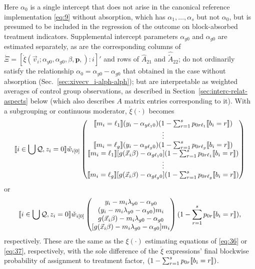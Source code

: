 \documentclass{article}
\DeclarePairedDelimiter{\indicator}{\llbracket}{\rrbracket}
\newcommand{\owt}[1][{[z_{i}]}]{\ensuremath{\check{w}_{i#1}}}
\begin{document}
Here $\alpha_{0}$ is a single intercept
that does not arise
in the canonical reference implementation \eqref{eq:9} without absorption, which has $\alpha_{1},
\ldots, \alpha_{s}$ but not $\alpha_{0}$,
but is presumed to be included in the
regression of the outcome on block-absorbed treatment indicators.
Supplemental intercept parameters $\alpha_{y0}$ and $\alpha_{g0}$ are estimated separately, as are the corresponding
columns of $\acute{\Xi} = [\acute{\xi}(\vec{v}_{i}; {\alpha}_{y0}, {\alpha}_{g0}, \beta, {\mathbf{p}}, ) :i]'$ and rows of $\hat{A}_{21}$ and $\hat{\tilde{A}}_{22}$; do not ordinarily satisfy the relationship $\alpha_{0} = \alpha_{y0} - \alpha_{g0}$ that obtained in the case without absorption (Sec.~\ref{sec:xivecv_i-alph-alph}); but are
interpretable as weighted averages of control group
observations, as described in Section~\ref{sec:interc-relat-aspects}
below (which also describes $A$ matrix entries corresponding to it).
With a subgrouping or continuous moderator, $\acute{\xi}(\cdot)$
becomes
\begin{equation*}
\indicator{i \in \bigcup \mathcal{Q}, z_{i}=0}\owt[{[0]}]
  \begin{pmatrix}
    \indicator{m_{i}=\ell_{1}}(y_{i}-\alpha_{y\ell_{1}0})  (1 - \sum_{r=1}^{s}p_{0r\ell_{1}}\indicator{b_{i}=r})\\
    \vdots\\
    \indicator{m_{i}=\ell_{g}}(y_{i}-\alpha_{y\ell_{g}0})  (1 - \sum_{r=1}^{s}p_{0r\ell_{g}}\indicator{b_{i}=r})\\
    \indicator{m_{i}=\ell_{1}}[g(\vec{x}_{i}\beta) -
    \alpha_{g\ell_{1}0}](1 - \sum_{r=1}^{s}p_{0r\ell_{1}}\indicator{b_{i}=r})\\
    \vdots\\
    \indicator{m_{i}=\ell_{g}}[g(\vec{x}_{i}\beta) -
    \alpha_{g\ell_{g}0}](1 - \sum_{r=1}^{s}p_{0r\ell_{g}}\indicator{b_{i}=r})\\
  \end{pmatrix}  
\end{equation*}
or
\begin{equation*}
  \indicator{i \in \bigcup \mathcal{Q}, z_{i}=0}\owt[{[0]}]
  \begin{pmatrix}
    y_{i}-m_{i}\lambda_{y0} - \alpha_{y0}\\
    (y_{i}-m_{i}\lambda_{y0} - \alpha_{y0})m_i\\    
    g(\vec{x}_{i}\beta) - m_{i}\lambda_{g0}- \alpha_{g0}\\
    [g(\vec{x}_{i}\beta) - m_{i}\lambda_{g0}- \alpha_{g0}]m_{i}\\
  \end{pmatrix}   (1 - \sum_{r=1}^{s}p_{0r}\indicator{b_{i}=r}),
\end{equation*}
respectively.  These are the same as the $\xi(\cdot)$ estimating
equations of \eqref{eq:36} or \eqref{eq:37}, respectively, with the
sole difference of the $\acute{\xi}$ expressions' final blockwise
probability of assignment to treatment factor,  $(1 -
\sum_{r=1}^{s}p_{0r}\indicator{b_{i}=r})$. 
\end{document}
